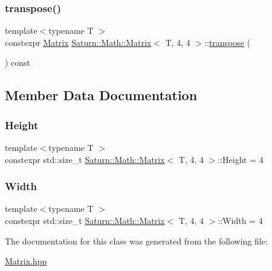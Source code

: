 \subsubsection{\texorpdfstring{transpose()}{transpose()}}
{\footnotesize\ttfamily template$<$typename T $>$ \\
constexpr \mbox{\hyperlink{class_saturn_1_1_math_1_1_matrix}{Matrix}} \mbox{\hyperlink{class_saturn_1_1_math_1_1_matrix}{Saturn\+::\+Math\+::\+Matrix}}$<$ T, 4, 4 $>$\+::\mbox{\hyperlink{glad_8h_a7ad291818ab127e386dec37f7e1bdb97}{transpose}} (\begin{DoxyParamCaption}{ }\end{DoxyParamCaption}) const\hspace{0.3cm}{\ttfamily [inline]}}



\subsection{Member Data Documentation}
\mbox{\label{class_saturn_1_1_math_1_1_matrix_3_01_t_00_014_00_014_01_4_a53f3e480546936c7c9d0fa0a6f8d8bda}} 
\subsubsection{\texorpdfstring{Height}{Height}}
{\footnotesize\ttfamily template$<$typename T $>$ \\
constexpr std\+::size\+\_\+t \mbox{\hyperlink{class_saturn_1_1_math_1_1_matrix}{Saturn\+::\+Math\+::\+Matrix}}$<$ T, 4, 4 $>$\+::Height = 4\hspace{0.3cm}{\ttfamily [static]}}

\mbox{\label{class_saturn_1_1_math_1_1_matrix_3_01_t_00_014_00_014_01_4_ae0e3e5c9ab2d8f43d74ef1485f2a46aa}} 
\subsubsection{\texorpdfstring{Width}{Width}}
{\footnotesize\ttfamily template$<$typename T $>$ \\
constexpr std\+::size\+\_\+t \mbox{\hyperlink{class_saturn_1_1_math_1_1_matrix}{Saturn\+::\+Math\+::\+Matrix}}$<$ T, 4, 4 $>$\+::Width = 4\hspace{0.3cm}{\ttfamily [static]}}



The documentation for this class was generated from the following file\+:\begin{DoxyCompactItemize}
\item 
\mbox{\hyperlink{_matrix_8hpp}{Matrix.\+hpp}}\end{DoxyCompactItemize}
